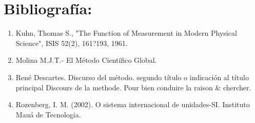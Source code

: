 \chapter*{Bibliografía:}

\begin{enumerate}
 \item Kuhn, Thomas S., "The Function of Measurement in Modern Physical Science", ISIS 52(2), 161?193, 1961.
 \item Molina M.J.T.- El Método Científico Global.
 \item René Descartes. Discurso del método. segundo título o indicación al título principal Discours de la methode. Pour bien 
conduire la raison \& chercher.
 \item Rozenberg, I. M. (2002). O sistema internacional de unidades-SI. Instituto Mauá de Tecnologia.
 \end{enumerate}
